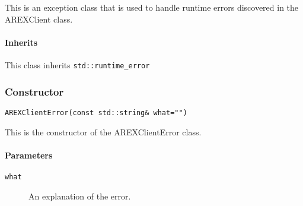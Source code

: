 This is an exception class that is used to handle runtime errors
discovered in the AREXClient class.

\paragraph{Inherits}
This class inherits \verb#std::runtime_error#


\subsubsection{Constructor}

\begin{shaded}
\verb#AREXClientError(const std::string& what="")#
\end{shaded}

This is the constructor of the AREXClientError class.

\paragraph{Parameters}
\begin{description}
\item[\texttt{what}] An explanation of the error.
\end{description}
